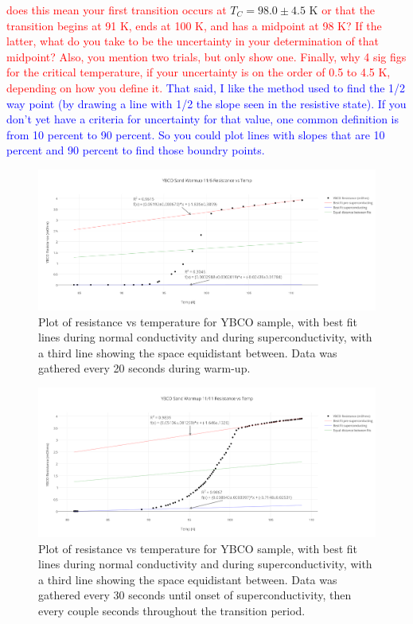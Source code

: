 \documentclass[prb,preprint]{revtex4-1}
\begin{document}
\textcolor{red}{does this mean your first transition occurs at }$T_C = 98.0 \pm 4.5 \textrm{ K}$ \textcolor{red}{ or that the transition begins at 91 K, ends at 100 K, and has a midpoint at 98 K? If the latter, what do you take to be the uncertainty in your determination of that midpoint? Also, you mention two trials, but only show one. Finally, why 4 sig figs for the critical temperature, if your uncertainty is on the order of 0.5 to 4.5 K, depending on how you define it. } 
\textcolor{blue}{That said, I like the method used to find the 1/2 way point (by drawing a line with 1/2 the slope seen in the resistive state). If you don't yet have a criteria for uncertainty for that value, one common definition is from 10 percent to 90 percent. So you could plot lines with slopes that are 10 percent and 90 percent to find those boundry points.} 

\begin{figure}[h!]
\centering
\includegraphics[width=7in]{ybco_sand_warmup_116_resistance_vs_temp.png}
\caption{Plot of resistance vs temperature for YBCO sample, with best fit lines during normal conductivity and during superconductivity, with a third line showing the space equidistant between. Data was gathered every 20 seconds during warm-up.}
\label{YBCOplot1}
\end{figure}

\begin{figure}[h!]
\centering
\includegraphics[width=7in]{ybco_sand_warmup_1111_resistance_vs_temp.png}
\caption{Plot of resistance vs temperature for YBCO sample, with best fit lines during normal conductivity and during superconductivity, with a third line showing the space equidistant between. Data was gathered every 30 seconds until onset of superconductivity, then every couple seconds throughout the transition period.}
\label{YBCOplot2}
\end{figure}
\end{document}

